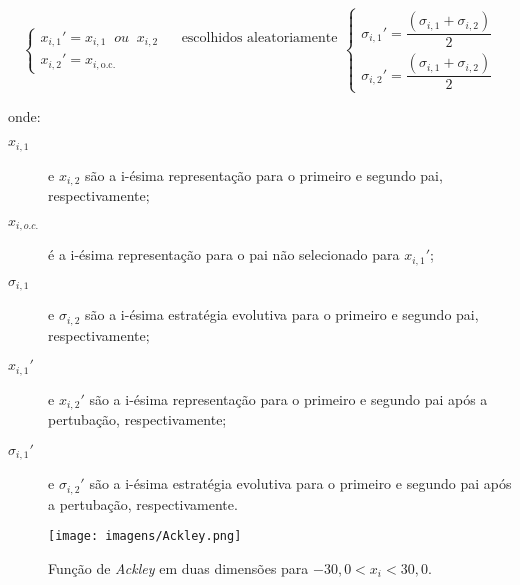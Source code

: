 \begin{subequations}
\begin{equation}\label{eq:rec_discreta}
\left\{\begin{array}{l}
x_{i,1}' = x_{i,1} \;\; \textit{ou} \;\; x_{i,2} \;\;\;\;\;\; \text{escolhidos
aleatoriamente}\\
x_{i,2}' = x_{i,\text{o.c.}}
\end{array}\right.
\end{equation}
\begin{equation}\label{eq:rec_intermediaria}
\left\{\begin{array}{l}
\sigma_{i,1}' = \dfrac{(\sigma_{i,1}+\sigma_{i,2})}{2} \\
\sigma_{i,2}' = \dfrac{(\sigma_{i,1}+\sigma_{i,2})}{2}
\end{array}\right.
\end{equation}
\end{subequations}

\noindent onde:

\begin{description}
\item[$x_{i,1}$] e $x_{i,2}$ são a i-ésima representação para o
primeiro e segundo pai, respectivamente; 
\item[$x_{i,o.c.}$] é a i-ésima representação para o pai não
selecionado para $x_{i,1}'$;
\item[$\sigma_{i,1}$] e $\sigma_{i,2}$ são a i-ésima estratégia
evolutiva para o primeiro e segundo pai, respectivamente;
\item[$x_{i,1}'$] e $x_{i,2}'$ são a i-ésima representação para o
primeiro e segundo pai após a pertubação, respectivamente; 
\item[$\sigma_{i,1}'$] e $\sigma_{i,2}'$ são a i-ésima estratégia
evolutiva para o primeiro e segundo pai após a pertubação,
respectivamente.
\end{description}

\begin{figure}[h!t]
\centering
\texttt{[image: imagens/Ackley.png]}
\caption{Função de \emph{Ackley} em duas dimensões para $-30,0< x_i <
30,0$.}
\label{fig:funcao_ackley}
\end{figure}

